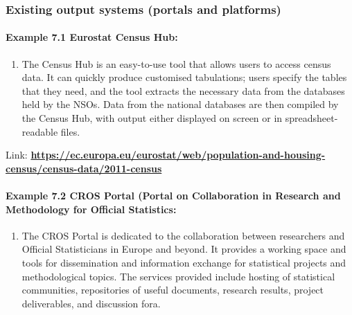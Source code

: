 \documentclass[
]{article}
\providecommand{\tightlist}{%
  \setlength{\itemsep}{0pt}\setlength{\parskip}{0pt}}
\begin{document}
\hypertarget{existing-output-systems-portals-and-platforms}{%
\subsubsection{Existing output systems (portals and platforms)}\label{existing-output-systems-portals-and-platforms}}

\hypertarget{example-7.1-eurostat-census-hub-1}{%
\paragraph{Example 7.1 Eurostat Census Hub:}\label{example-7.1-eurostat-census-hub-1}}

\begin{enumerate}
\def\labelenumi{\arabic{enumi}.}
\setcounter{enumi}{497}
\tightlist
\item
  The Census Hub is an easy-to-use tool that allows users to access
  census data. It can quickly produce customised tabulations; users
  specify the tables that they need, and the tool extracts the
  necessary data from the databases held by the NSOs. Data from the
  national databases are then compiled by the Census Hub, with output
  either displayed on screen or in spreadsheet-readable files.
\end{enumerate}

Link:
\href{https://ec.europa.eu/eurostat/web/population-and-housing-census/census-data/2011-census}{\textbf{https://ec.europa.eu/eurostat/web/population-and-housing-census/census-data/2011-census}}

\hypertarget{example-7.2-cros-portal-portal-on-collaboration-in-research-and-methodology-for-official-statistics-1}{%
\paragraph{\texorpdfstring{Example 7.2 \textbf{CROS Portal} (Portal on Collaboration in Research and Methodology for Official Statistics:}{Example 7.2 CROS Portal (Portal on Collaboration in Research and Methodology for Official Statistics:}}\label{example-7.2-cros-portal-portal-on-collaboration-in-research-and-methodology-for-official-statistics-1}}

\begin{enumerate}
\def\labelenumi{\arabic{enumi}.}
\setcounter{enumi}{498}
\tightlist
\item
  The CROS Portal is dedicated to the collaboration between
  researchers and Official Statisticians in Europe and beyond. It
  provides a working space and tools for dissemination and information
  exchange for statistical projects and methodological topics. The
  services provided include hosting of statistical communities,
  repositories of useful documents, research results, project
  deliverables, and discussion fora.
\end{enumerate}
\end{document}
